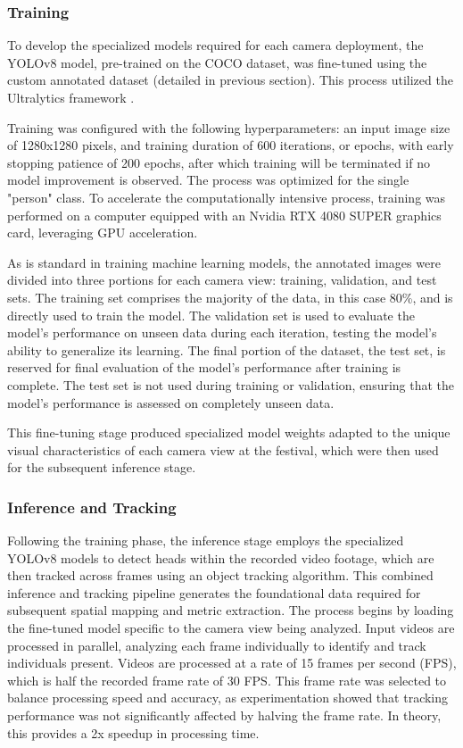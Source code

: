 \subsubsection{Training}
To develop the specialized models required for each camera deployment, the YOLOv8 model, pre-trained on the COCO dataset, was fine-tuned using the custom annotated dataset (detailed in previous section). This process utilized the Ultralytics framework \cite{ultralytics}.

Training was configured with the following hyperparameters: an input image size of 1280x1280 pixels, and training duration of 600 iterations, or epochs, with early stopping patience of 200 epochs, after which training will be terminated if no model improvement is observed. The process was optimized for the single "person" class. To accelerate the computationally intensive process, training was performed on a computer equipped with an Nvidia RTX 4080 SUPER graphics card, leveraging GPU acceleration.

As is standard in training machine learning models, the annotated images were divided into three portions for each camera view: training, validation, and test sets. The training set comprises the majority of the data, in this case 80\%, and is directly used to train the model. The validation set is used to evaluate the model's performance on unseen data during each iteration, testing the model's ability to generalize its learning. The final portion of the dataset, the test set, is reserved for final evaluation of the model's performance after training is complete. The test set is not used during training or validation, ensuring that the model's performance is assessed on completely unseen data.

This fine-tuning stage produced specialized model weights adapted to the unique visual characteristics of each camera view at the festival, which were then used for the subsequent inference stage.

\subsubsection{Inference and Tracking}
Following the training phase, the inference stage employs the specialized YOLOv8 models to detect heads within the recorded video footage, which are then tracked across frames using an object tracking algorithm. This combined inference and tracking pipeline generates the foundational data required for subsequent spatial mapping and metric extraction. The process begins by loading the fine-tuned model specific to the camera view being analyzed. Input videos are processed in parallel, analyzing each frame individually to identify and track individuals present. Videos are processed at a rate of 15 frames per second (FPS), which is half the recorded frame rate of 30 FPS. This frame rate was selected to balance processing speed and accuracy, as experimentation showed that tracking performance was not significantly affected by halving the frame rate. In theory, this provides a 2x speedup in processing time.

